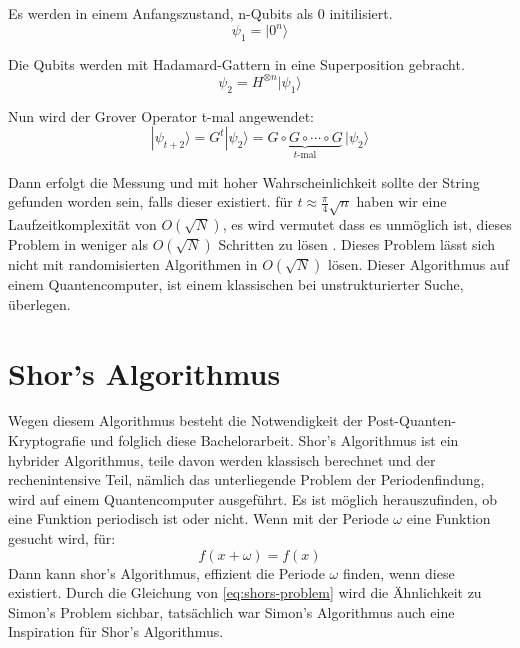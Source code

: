 Es werden in einem Anfangszustand, n-Qubits als 0 initilisiert.
\begin{equation}
    \psi_1=|0^n\rangle
\end{equation}

Die Qubits werden mit Hadamard-Gattern in eine Superposition gebracht.
\begin{equation}
    \psi_2=H^{\otimes n}|\psi_1\rangle
\end{equation}

Nun wird der Grover Operator t-mal angewendet:
\begin{equation}
    |\psi_{t+2}\rangle=G^t|\psi_2\rangle=\underbrace{G \circ G \circ \cdots \circ G}_{t\text{-mal}}\,|\psi_2\rangle
\end{equation}

Dann erfolgt die Messung und mit hoher Wahrscheinlichkeit sollte der String gefunden worden sein, falls dieser existiert.
für $t\approx\frac{\pi}{4}\sqrt{n}$ haben wir eine Laufzeitkomplexität von $O(\sqrt{N})$, es wird vermutet dass es unmöglich ist, dieses Problem in weniger als $O(\sqrt{N})$ Schritten zu lösen \cite{groverFastQuantumMechanical1996}.
Dieses Problem lässt sich nicht mit randomisierten Algorithmen in $O(\sqrt{N})$ lösen.
Dieser Algorithmus auf einem Quantencomputer, ist einem klassischen bei unstrukturierter Suche, überlegen.

\section{Shor's Algorithmus}
Wegen diesem Algorithmus besteht die Notwendigkeit der Post-Quanten-Kryptografie und folglich diese Bachelorarbeit.
Shor's Algorithmus ist ein hybrider Algorithmus, teile davon werden klassisch berechnet und der rechenintensive Teil, nämlich das unterliegende Problem der Periodenfindung, wird auf einem Quantencomputer ausgeführt.
Es ist möglich herauszufinden, ob eine Funktion periodisch ist oder nicht.
Wenn mit der Periode $\omega$ eine Funktion gesucht wird, für:
\begin{equation}
    f(x+\omega)=f(x)
    \label{eq:shors-problem}
\end{equation}
Dann kann shor's Algorithmus, effizient die Periode $\omega$ finden, wenn diese existiert.
Durch die Gleichung von \ref{eq:shors-problem} wird die Ähnlichkeit zu Simon's Problem sichbar, tatsächlich war Simon's Algorithmus auch eine Inspiration für Shor's Algorithmus.


